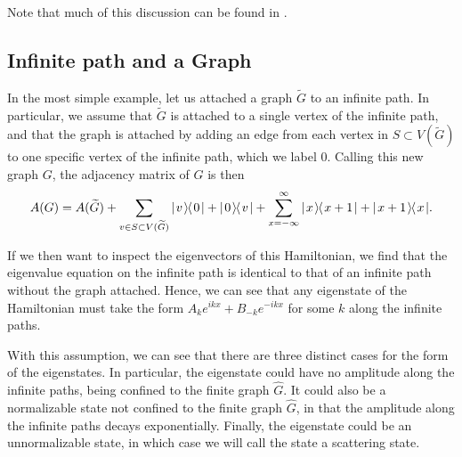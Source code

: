 \documentclass[../thesis-main/thesis-main]{subfiles}
\begin{document}
Note that much of this discussion can be found in \cite{CG12}.

\subsection{Infinite path and a Graph}

In the most simple example, let us attached a graph $\widetilde{G}$ to an infinite path.  In particular, we assume that $\widetilde{G}$ is attached to a single vertex of the infinite path, and that the graph is attached by adding an edge from each vertex in $S\subset V(\widetilde{G})$ to one specific vertex of the infinite path, which we label $0$.  Calling this new graph $G$, the adjacency matrix of $G$ is then
\begin{equation}
  A(G) = A(\widetilde{G}) + \sum_{v\in S \subset V(\widetilde{G})} |\mspace{2mu} v \mspace{2mu} \rangle\mspace{-2mu}\langle\mspace{2mu} 0 \mspace{2mu} | + |\mspace{2mu} 0 \mspace{2mu} \rangle\mspace{-2mu}\langle\mspace{2mu} v \mspace{2mu} | + \sum_{x=-\infty}^\infty |\mspace{2mu} x \mspace{2mu} \rangle\mspace{-2mu}\langle\mspace{2mu} x+1 \mspace{2mu} | + |\mspace{2mu} x+1 \mspace{2mu} \rangle\mspace{-2mu}\langle\mspace{2mu} x \mspace{2mu} |.
\end{equation}

If we then want to inspect the eigenvectors of this Hamiltonian, we find that the eigenvalue equation on the infinite path is identical to that of an infinite path without the graph attached.  Hence, we can see that any eigenstate of the Hamiltonian must take the form $A_ke^{i k x} + B_{-k}e^{-i k x}$ for some $k$ along the infinite paths.  

With this assumption, we can see that there are three distinct cases for the form of the eigenstates.  In particular, the eigenstate could have no amplitude along the infinite paths, being confined to the finite graph $\widehat{G}$.  It could also be a normalizable state not confined to the finite graph $\widehat{G}$, in that the amplitude along the infinite paths decays exponentially.  Finally, the eigenstate could be an unnormalizable state, in which case we will call the state a scattering state.
\end{document}
